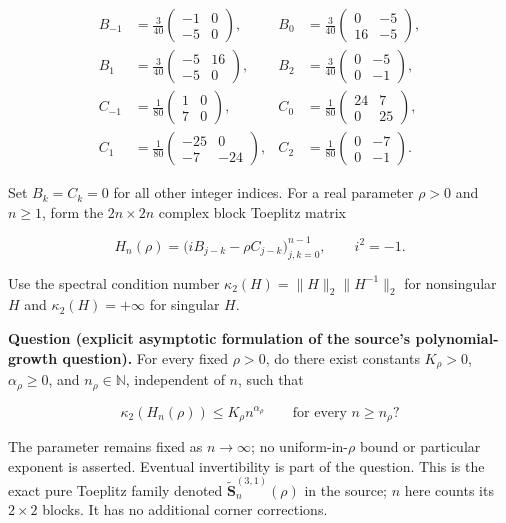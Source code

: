 \documentclass[11pt,a4paper]{article}
\begin{document}
\[\begin{aligned}
B_{-1}&=\frac3{40}\begin{pmatrix}-1&0\\-5&0\end{pmatrix},&
B_0&=\frac3{40}\begin{pmatrix}0&-5\\16&-5\end{pmatrix},\\
B_1&=\frac3{40}\begin{pmatrix}-5&16\\-5&0\end{pmatrix},&
B_2&=\frac3{40}\begin{pmatrix}0&-5\\0&-1\end{pmatrix},\\
C_{-1}&=\frac1{80}\begin{pmatrix}1&0\\7&0\end{pmatrix},&
C_0&=\frac1{80}\begin{pmatrix}24&7\\0&25\end{pmatrix},\\
C_1&=\frac1{80}\begin{pmatrix}-25&0\\-7&-24\end{pmatrix},&
C_2&=\frac1{80}\begin{pmatrix}0&-7\\0&-1\end{pmatrix}.
\end{aligned}\]

Set \(B_k=C_k=0\) for all other integer indices. For a real parameter
\(\rho>0\) and \(n\ge1\), form the \(2n\times2n\) complex block Toeplitz
matrix

\[H_n(\rho)=\bigl(iB_{j-k}-\rho C_{j-k}\bigr)_{j,k=0}^{n-1},
\qquad i^2=-1.\]

Use the spectral condition number \(\kappa_2(H)=\|H\|_2\|H^{-1}\|_2\)
for nonsingular \(H\) and \(\kappa_2(H)=+\infty\) for singular \(H\).

\textbf{Question (explicit asymptotic formulation of the source's
polynomial-growth question).} For every fixed \(\rho>0\), do there exist
constants \(K_\rho>0\), \(\alpha_\rho\ge0\), and \(n_\rho\in\mathbb N\),
independent of \(n\), such that

\[\kappa_2(H_n(\rho))\le K_\rho n^{\alpha_\rho}
\qquad\text{for every }n\ge n_\rho?\]

The parameter remains fixed as \(n\to\infty\); no uniform-in-\(\rho\)
bound or particular exponent is asserted. Eventual invertibility is part
of the question. This is the exact pure Toeplitz family denoted
\(\widetilde{\mathbf S}_n^{(3,1)}(\rho)\) in the source; \(n\) here
counts its \(2\times2\) blocks. It has no additional corner corrections.
\end{document}

